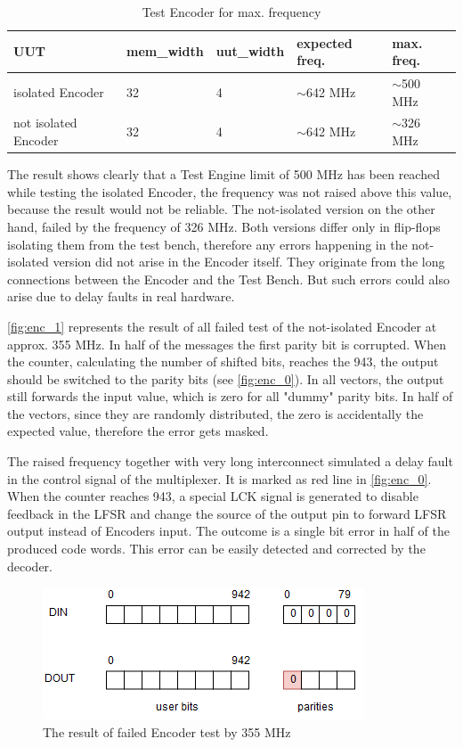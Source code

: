 \begin{table}[h]
\begin{tabular}{@{}lllll@{}}
\toprule
UUT                       &mem\_width   &uut\_width &expected freq. &max. freq.\\ 
\midrule
isolated Encoder                  & 32          & 4      & $\sim$642 MHz & $\sim$500 MHz \\
not isolated Encoder              & 32          & 4      & $\sim$642 MHz & $\sim$326 MHz \\
\bottomrule
\end{tabular}
\centering
\caption{Test Encoder for max. frequency}\label{tab:enc}
\end{table}

The result shows clearly that a Test Engine limit of 500 MHz has been reached while testing the isolated Encoder, the frequency was not raised above this value, because the result would not be reliable. The not-isolated version on the other hand, failed by the frequency of 326 MHz. Both versions differ only in flip-flops isolating them from the test bench, therefore any errors happening in the not-isolated version did not arise in the Encoder itself. They originate from the long connections between the Encoder and the Test Bench. But such errors could also arise due to delay faults in real hardware. 

\autoref{fig:enc_1} represents the result of all failed test of the not-isolated Encoder at approx. 355 MHz. In half of the messages the first parity bit is corrupted. When the counter, calculating the number of shifted bits, reaches the 943, the output should be switched to the parity bits (see \autoref{fig:enc_0}). In all vectors, the output still forwards the input value, which is zero for all "dummy" parity bits. In half of the vectors, since they are randomly distributed, the zero is accidentally the expected value, therefore the error gets masked.

The raised frequency together with very long interconnect simulated a delay fault in the control signal of the multiplexer. It is marked as red line in \autoref{fig:enc_0}. When the counter reaches 943, a special LCK signal is generated to disable feedback in the LFSR and change the source of the output pin to forward LFSR output instead of Encoders input. The outcome is a single bit error in half of the produced code words. This error can be easily detected and corrected by the decoder.

\begin{figure}[h]
\centering
\includegraphics[width=.5\textwidth]{figures/enc_error.png}
\caption{The result of failed Encoder test by 355 MHz}
\label{fig:enc_1}
\end{figure}


